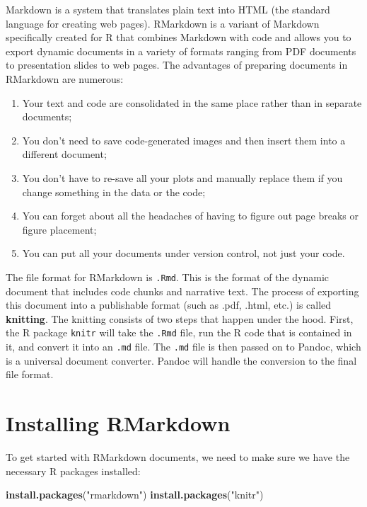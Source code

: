 \documentclass[
]{book}
\newenvironment{Shaded}{\begin{snugshade}}{\end{snugshade}}
\newcommand{\FunctionTok}[1]{\textcolor[rgb]{0.13,0.29,0.53}{\textbf{#1}}}
\newcommand{\NormalTok}[1]{#1}
\newcommand{\StringTok}[1]{\textcolor[rgb]{0.31,0.60,0.02}{#1}}
\providecommand{\tightlist}{%
  \setlength{\itemsep}{0pt}\setlength{\parskip}{0pt}}
\begin{document}
Markdown is a system that translates plain text into HTML (the standard language
for creating web pages). RMarkdown is a variant of Markdown specifically created
for R that combines Markdown with code and allows you to export dynamic
documents in a variety of formats ranging from PDF documents to presentation
slides to web pages. The advantages of preparing documents in RMarkdown are
numerous:

\begin{enumerate}
\def\labelenumi{\arabic{enumi}.}
\tightlist
\item
  Your text and code are consolidated in the same place rather than in separate
  documents;
\item
  You don't need to save code-generated images and then insert them into a
  different document;
\item
  You don't have to re-save all your plots and manually replace them if you
  change something in the data or the code;
\item
  You can forget about all the headaches of having to figure out page breaks or
  figure placement;
\item
  You can put all your documents under version control, not just your code.
\end{enumerate}

The file format for RMarkdown is \texttt{.Rmd}. This is the format of the dynamic
document that includes code chunks and narrative text. The process of exporting
this document into a publishable format (such as .pdf, .html, etc.) is called
\textbf{knitting}. The knitting consists of two steps that happen under the hood. First,
the R package \texttt{knitr} will take the \texttt{.Rmd} file, run the R code that is
contained in it, and convert it into an \texttt{.md} file. The \texttt{.md} file is then
passed on to Pandoc, which is a universal document converter. Pandoc will handle
the conversion to the final file format.

\hypertarget{installing-rmarkdown}{%
\section{Installing RMarkdown}\label{installing-rmarkdown}}

To get started with RMarkdown documents, we need to make sure we have the
necessary R packages installed:

\begin{Shaded}
\begin{Highlighting}[]
\FunctionTok{install.packages}\NormalTok{(}\StringTok{"rmarkdown"}\NormalTok{) }
\FunctionTok{install.packages}\NormalTok{(}\StringTok{"knitr"}\NormalTok{)}
\end{Highlighting}
\end{Shaded}
\end{document}
